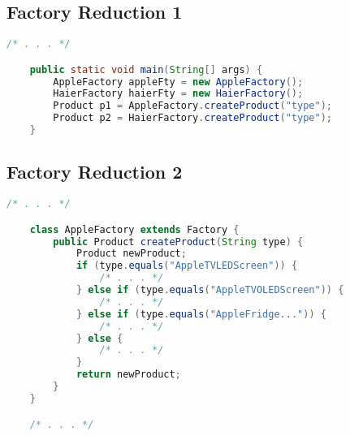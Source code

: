 \documentclass[a4paper]{article}
\begin{document}
\newpage

\subsection{Factory Reduction 1}\label{code-cli}

\begin{lstlisting}[language=java]
    /* . . . */

    public static void main(String[] args) {
        AppleFactory appleFty = new AppleFactory();
        HaierFactory haierFty = new HaierFactory();
        Product p1 = AppleFactory.createProduct("type");
        Product p2 = HaierFactory.createProduct("type");
    }
\end{lstlisting}

\subsection{Factory Reduction 2}\label{code-pro}
\begin{lstlisting}[language=java]
    /* . . . */

    class AppleFactory extends Factory {
        public Product createProduct(String type) {
            Product newProduct;
            if (type.equals("AppleTVLEDScreen")) {
                /* . . . */
            } else if (type.equals("AppleTVOLEDScreen")) {
                /* . . . */
            } else if (type.equals("AppleFridge...")) {
                /* . . . */
            } else {
                /* . . . */
            }
            return newProduct;
        }
    }

    /* . . . */
\end{lstlisting}
\end{document}
